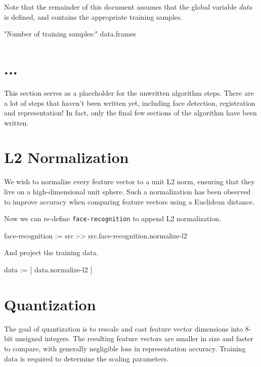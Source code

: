 \documentclass{article}
\begin{document}
Note that the remainder of this document assumes that the global variable \emph{data} is defined, and contains the appropriate training samples.

\begin{likely}
"Number of training samples:"
data.frames
\end{likely}

\section{...}
This section serves as a placeholder for the unwritten algorithm steps.
There are a lot of steps that haven't been written yet, including face detection, registration and representation!
In fact, only the final few sections of the algorithm have been written.

\section{L2 Normalization}
We wish to normalize every feature vector to a unit L2 norm, ensuring that they live on a high-dimensional unit sphere.
Such a normalization has been observed to improve accuracy when comparing feature vectors using a Euclidean distance.


Now we can re-define \texttt{face-recognition} to append L2 normalization.

\begin{likely}
face-recognition :=
  src :->
    src.face-recognition.normalize-l2
\end{likely}

And project the training data.

\begin{likely}
data := [ data.normalize-l2 ]
\end{likely}

\section{Quantization}
The goal of quantization is to rescale and cast feature vector dimensions into 8-bit unsigned integers.
The resulting feature vectors are smaller in size and faster to compare, with generally negligible loss in representation accuracy.
Training data is required to determine the scaling parameters.
\end{document}
